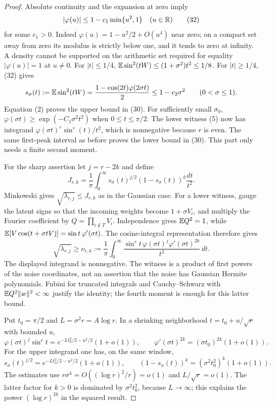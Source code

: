 \begin{proof}
Absolute continuity and the expansion at zero imply
\[
 |\varphi(u)|\le1-c_1\min\{u^2,1\}\quad(u\in\mathbb R)
 \tag{32}
\]
for some $c_1>0$. Indeed $\varphi(u)=1-u^2/2+O(u^4)$ near zero;
on a compact set away from zero its modulus is strictly below one,
and it tends to zero at infinity. A density cannot be supported on the
arithmetic set required for equality $|\varphi(u)|=1$ at $u\ne0$.
For $|t|\le1/4$, $\mathbb E\sin^2(tW)\le(1+\sigma^2)t^2\le1/8$.
For $|t|\ge1/4$, (32) gives
\[
 s_\sigma(t):=\mathbb E\sin^2(tW)
       =\frac{1-\cos(2t)\varphi(2\sigma t)}2
       \le1-c_2\sigma^2\qquad(0<\sigma\le1).
\]
Equation (2) proves the upper bound in (30). For sufficiently small
$\sigma_0$, $\varphi(\sigma t)\ge\exp(-C_1\sigma^2t^2)$ when
$0\le t\le\pi/2$. The lower witness (5) now has integrand
$\varphi(\sigma t)^r\sin^r(t)/t^2$, which is nonnegative because
$r$ is even. The same first-peak interval as before proves the lower
bound in (30). This part only needs a finite second moment.

For the sharp assertion let $j=r-2k$ and define
\[
 J_{r,k}=\frac1\pi\int_0^\infty
       s_\sigma(t)^{j/2}(1-s_\sigma(t))^k\frac{dt}{t^2}.
\]
Minkowski gives $\sqrt{\lambda_{r,j}}\le J_{r,k}$ as in the Gaussian
case. For a lower witness, gauge the latent signs so that the incoming
weights become $1+\sigma V_i$, and multiply the Fourier coefficient by
$Q=\prod_{i\notin T}V_i$. Independence gives $\mathbb E Q^2=1$, while
$\mathbb E[V\cos(t+\sigma tV)]=\sin t\,\varphi'(\sigma t)$.
The cosine-integral representation therefore gives
\[
 \sqrt{\lambda_{r,j}}\ge\nu_{r,k}:=
 \frac1\pi\int_0^\infty
 \frac{\sin^r t\,\varphi(\sigma t)^j
                    \varphi'(\sigma t)^{2k}}{t^2}\,dt.
 \tag{33}
\]
The displayed integrand is nonnegative. The witness is a product of
first powers of the noise coordinates, not an assertion that the noise
has Gaussian Hermite polynomials. Fubini for truncated integrals and
Cauchy--Schwarz with $\mathbb E Q^2\|w\|^2<\infty$ justify the identity;
the fourth moment is enough for this latter bound.

Put $t_0=\pi/2$ and $L=\sigma^2r=A\log r$.
In a shrinking neighborhood $t=t_0+u/\sqrt r$ with bounded $u$,
\[
 \varphi(\sigma t)^j\sin^r t
     =e^{-Lt_0^2/2-u^2/2}(1+o(1)),\qquad
 \varphi'(\sigma t)^{2k}=(\sigma t_0)^{2k}(1+o(1)).
\]
For the upper integrand one has, on the same window,
\[
 s_\sigma(t)^{j/2}
     =e^{-Lt_0^2/2-u^2/2}(1+o(1)),\qquad
 (1-s_\sigma(t))^k=(\sigma^2t_0^2)^k(1+o(1)).
\]
The estimates use $r\sigma^4=O((\log r)^2/r)=o(1)$ and
$L/\sqrt r=o(1)$. The latter factor for $k>0$ is dominated by
$\sigma^2t_0^2$, because $L\to\infty$; this explains the power
$(\log r)^{2k}$ in the squared result.


\end{proof}

